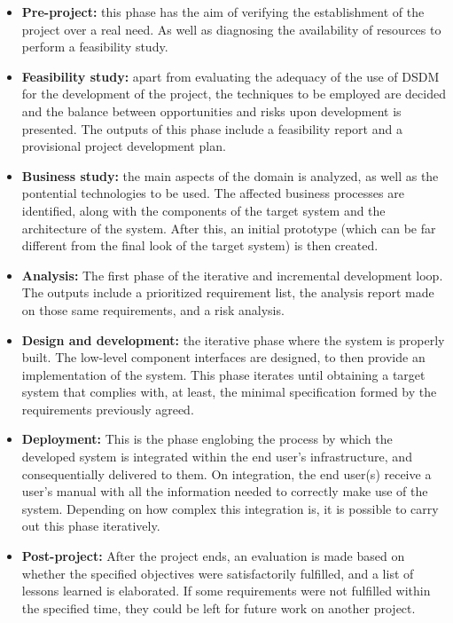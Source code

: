 \begin{itemize}
    \item \textbf{Pre-project: }this phase has the aim of verifying the establishment of the project over a real need. As well as diagnosing the availability of resources to perform
    a feasibility study.

    \item  \textbf{Feasibility study: }apart from evaluating the adequacy of the use of \acrshort{DSDM} for the development of the project, the techniques to be employed are decided and the
    balance between opportunities and risks upon development is presented. The outputs of this phase include a feasibility report and a provisional project development plan.

    \item \textbf{Business study: }the main aspects of the domain is analyzed, as well as the pontential technologies to be used. The affected business processes are identified,
    along with the components of the target system and the architecture of the system. After this, an initial prototype (which can be far different from the final look of the target
    system) is then created.

    \item \textbf{Analysis: }The first phase of the iterative and incremental development loop. The outputs include a prioritized requirement list, the analysis report
    made on those same requirements, and a risk analysis.

    \item \textbf{Design and development: }the iterative phase where the system is properly built. The low-level component interfaces are designed, to then provide an implementation
    of the system. This phase iterates until obtaining a target system that complies with, at least, the minimal specification formed by the requirements previously agreed.

    \item \textbf{Deployment: }This is the phase englobing the process by which the developed system is integrated within the end user's infrastructure, and consequentially delivered
    to them. On integration, the end user(s) receive a user's manual with all the information needed to correctly make use of the system. Depending on how complex this integration is,
    it is possible to carry out this phase iteratively.

    \item \textbf{Post-project: }After the project ends, an evaluation is made based on whether the specified objectives were satisfactorily fulfilled, and a list of lessons learned is elaborated.
    If some requirements were not fulfilled within the specified time, they could be left for future work on another project.
\end{itemize}

